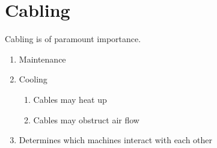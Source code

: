 \chapter{Cabling}
Cabling is of paramount importance.
\begin{enumerate}
   \item Maintenance
   \item Cooling
   \begin{enumerate}
      \item Cables may heat up
      \item Cables may obstruct air flow
   \end{enumerate}
   \item Determines which machines interact with each other
\end{enumerate}
